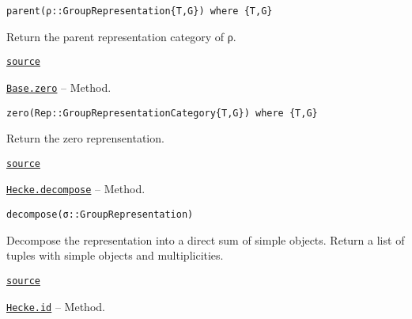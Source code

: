 \documentclass{memoir}
\begin{document}
\begin{adjustwidth}{2em}{0pt}


\begin{verbatim}
parent(ρ::GroupRepresentation{T,G}) where {T,G}
\end{verbatim}

Return the parent representation category of ρ.



\href{https://github.com/FabianMaeurer/JuCat.jl/blob/367390e2d003deec2ababa73caeab405e934bb35/src/structures/Representations/GroupRepresentations.jl#L102-L106}{\texttt{source}}


\end{adjustwidth}
\hypertarget{12739541320780261150}{} 
\hyperlink{12739541320780261150}{\texttt{Base.zero}}  -- {Method.}

\begin{adjustwidth}{2em}{0pt}


\begin{verbatim}
zero(Rep::GroupRepresentationCategory{T,G}) where {T,G}
\end{verbatim}

Return the zero reprensentation.



\href{https://github.com/FabianMaeurer/JuCat.jl/blob/367390e2d003deec2ababa73caeab405e934bb35/src/structures/Representations/GroupRepresentations.jl#L109-L113}{\texttt{source}}


\end{adjustwidth}
\hypertarget{12309669422231862422}{} 
\hyperlink{12309669422231862422}{\texttt{Hecke.decompose}}  -- {Method.}

\begin{adjustwidth}{2em}{0pt}


\begin{verbatim}
decompose(σ::GroupRepresentation)
\end{verbatim}

Decompose the representation into a direct sum of simple objects. Return a list of tuples with simple objects and multiplicities.



\href{https://github.com/FabianMaeurer/JuCat.jl/blob/367390e2d003deec2ababa73caeab405e934bb35/src/structures/Representations/GroupRepresentations.jl#L407-L412}{\texttt{source}}


\end{adjustwidth}
\hypertarget{13339681357403674067}{} 
\hyperlink{13339681357403674067}{\texttt{Hecke.id}}  -- {Method.}
\end{document}
